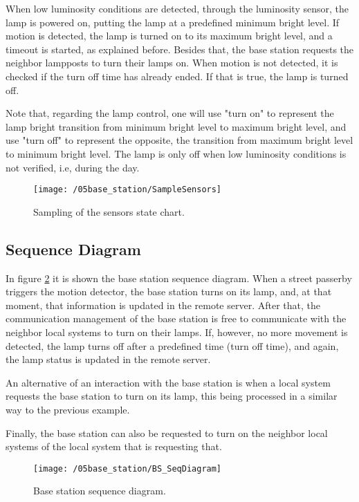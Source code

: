 When low luminosity conditions are detected, through the luminosity sensor, the lamp is powered on, putting the lamp at a predefined minimum bright level. If motion is detected, the lamp is turned on to its maximum bright level, and a timeout is started, as explained before. Besides that, the base station requests the neighbor lampposts to turn their lamps on. When motion is not detected, it is checked if the turn off time has already ended. If that is true, the lamp is turned off.

Note that, regarding the lamp control, one will use "turn on" to represent the lamp bright transition from minimum bright level to maximum bright level, and use "turn off" to represent the opposite, the transition from maximum bright level to minimum bright level. The lamp is only off when low luminosity conditions is not verified, i.e, during the day.

\begin{figure}[ht]
	\centering
	\texttt{[image: /05base\_station/SampleSensors]}
	\caption{Sampling of the sensors state chart.}
	\label{fig:sample_sensors}
\end{figure}

\clearpage
\subsection{Sequence Diagram}
In figure \ref{fig:bs_seq_diagram} it is shown the base station sequence diagram. When a street passerby triggers the motion detector, the base station turns on its lamp, and, at that moment, that information is updated in the remote server. After that, the communication management of the base station is free to communicate with the neighbor local systems to turn on their lamps. If, however, no more movement is detected, the lamp turns off after a predefined time (turn off time), and again, the lamp status is updated in the remote server.

An alternative of an interaction with the base station is when a local system requests the base station to turn on its lamp, this being processed in a similar way to the previous example.

Finally, the base station can also be requested to turn on the neighbor local systems of the local system that is requesting that.
\begin{figure}[ht]
	\centering
	\texttt{[image: /05base\_station/BS\_SeqDiagram]}
	\caption{Base station sequence diagram.}
	\label{fig:bs_seq_diagram}
\end{figure}